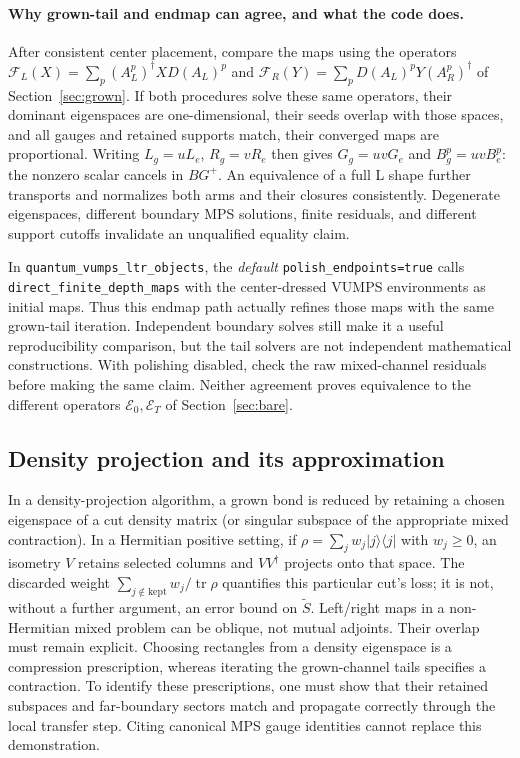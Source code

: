 \documentclass[11pt]{article}
\newcommand{\tr}{\operatorname{tr}}
\newcommand{\tS}{\widetilde S}
\newcommand{\code}[1]{{\small\nolinkurl{#1}}}
\begin{document}
\paragraph{Why grown-tail and endmap can agree, and what the code does.}
After consistent center placement, compare the maps using the operators
$\mathcal F_L(X)=\sum_p(A_L^p)^\dagger X D(A_L)^p$ and
$\mathcal F_R(Y)=\sum_pD(A_L)^pY(A_R^p)^\dagger$ of Section~\ref{sec:grown}.
If both procedures solve these same operators, their dominant eigenspaces
are one-dimensional, their seeds overlap with those spaces, and all gauges
and retained supports match, their converged maps are proportional.
Writing $L_g=uL_e$, $R_g=vR_e$ then gives
$G_g=uvG_e$ and $B_g^p=uvB_e^p$: the nonzero scalar cancels in $BG^+$.
An equivalence of a full L shape further transports and normalizes both arms
and their closures consistently. Degenerate eigenspaces, different boundary
MPS solutions, finite residuals, and different support cutoffs invalidate an
unqualified equality claim.

In \code{quantum_vumps_ltr_objects}, the \emph{default}
\code{polish_endpoints=true} calls \code{direct_finite_depth_maps} with the
center-dressed VUMPS environments as initial maps. Thus this endmap path
actually refines those maps with the same grown-tail iteration. Independent
boundary solves still make it a useful reproducibility comparison, but the
tail solvers are not independent mathematical constructions. With polishing
disabled, check the raw mixed-channel residuals before making the same claim.
Neither agreement proves equivalence to the different operators
$\mathcal E_0,\mathcal E_T$ of Section~\ref{sec:bare}.
\fi

\ifdetailed
\subsection{Density projection and its approximation}
In a density-projection algorithm, a grown bond is reduced by retaining a
chosen eigenspace of a cut density matrix (or singular subspace of the
appropriate mixed contraction). In a Hermitian positive setting, if
$\rho=\sum_j w_j|j\rangle\langle j|$ with $w_j\geq0$, an isometry $V$ retains
selected columns and $VV^\dagger$ projects onto that space. The discarded
weight $\sum_{j\notin\mathrm{kept}}w_j/\tr\rho$ quantifies this particular cut's
loss; it is not, without a further argument, an error bound on $\tS$.
Left/right maps in a non-Hermitian mixed problem can be oblique, not mutual
adjoints. Their overlap must remain explicit. Choosing rectangles from a
density eigenspace is a compression prescription, whereas iterating the
grown-channel tails specifies a contraction. To identify these prescriptions,
one must show that their retained subspaces and far-boundary sectors match
and propagate correctly through the local transfer step. Citing canonical
MPS gauge identities cannot replace this demonstration.
\fi
\end{document}
